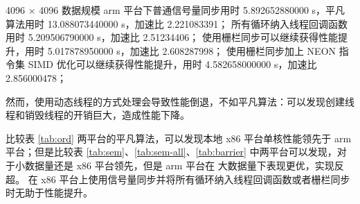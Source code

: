 \documentclass[a4paper]{article}
\begin{document}
4096 × 4096 数据规模 arm 平台下普通信号量同步用时 5.892652880000 s，平凡算法用时 13.088073440000 s，加速比 2.221083391；
所有循环纳入线程回调函数用时 5.209506790000 s，加速比 2.51234406；
使用栅栏同步可以继续获得性能提升，用时 5.017878950000 s，加速比 2.608287998；
使用栅栏同步加上 NEON 指令集 SIMD 优化可以继续获得性能提升，用时 4.582658000000 s，加速比 2.856000478；

然而，使用动态线程的方式处理会导致性能倒退，不如平凡算法：可以发现创建线程和销毁线程的开销巨大，造成性能下降。

比较表 \ref{tab:ord} 两平台的平凡算法，可以发现本地 x86 平台单核性能领先于 arm 平台；但是比较表 \ref{tab:sem}、\ref{tab:sem-all}、\ref{tab:barrier} 中两平台可以发现，对于小数据量还是 x86 平台领先，但是 arm 平台在 大数据量下表现更优，实现反超。
在 x86 平台上使用信号量同步并将所有循环纳入线程回调函数或者栅栏同步时无助于性能提升。
\end{document}
